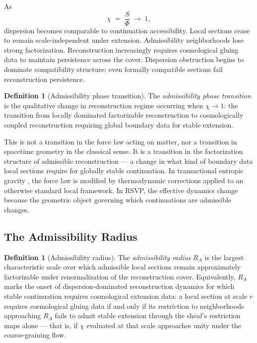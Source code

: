 \documentclass[11pt, a4paper]{article}
\theoremstyle{plain}
\theoremstyle{definition}
\newtheorem{definition}[theorem]{Definition}
\theoremstyle{remark}
\newcommand{\RA}{R_{\!A}}
\begin{document}
As
\begin{equation}
  \chi \;=\; \frac{S}{\Phi} \;\longrightarrow\; 1,
\end{equation}
dispersion becomes comparable to continuation accessibility. Local sections cease to
remain scale-independent under extension. Admissibility neighborhoods lose strong
factorization. Reconstruction increasingly requires cosmological gluing data to
maintain persistence across the cover. Dispersion obstruction begins to dominate
compatibility structure: even formally compatible sections fail reconstruction
persistence.

\begin{definition}[Admissibility phase transition]
\label{def:phase-trans}
The \emph{admissibility phase transition} is the qualitative change in reconstruction
regime occurring when $\chi \to 1$: the transition from locally dominated
factorizable reconstruction to cosmologically coupled reconstruction requiring global
boundary data for stable extension.
\end{definition}

This is not a transition in the force law acting on matter, nor a transition in
spacetime geometry in the classical sense. It is a transition in the factorization
structure of admissible reconstruction --- a change in what kind of boundary data
local sections require for globally stable continuation. In transactional entropic
gravity \cite{kastner2024}, the force law is modified by thermodynamic corrections
applied to an otherwise standard local framework. In RSVP, the effective dynamics
change because the geometric object governing which continuations are admissible
changes.

\subsection{The Admissibility Radius}

\begin{definition}[Admissibility radius]
\label{def:RA}
The \emph{admissibility radius} $\RA$ is the largest characteristic scale over which
admissible local sections remain approximately factorizable under renormalization of
the reconstruction cover. Equivalently, $\RA$ marks the onset of
dispersion-dominated reconstruction dynamics for which stable continuation requires
cosmological extension data: a local section at scale $r$ requires cosmological
gluing data if and only if its restriction to neighborhoods approaching $\RA$ fails
to admit stable extension through the sheaf's restriction maps alone --- that is, if
$\chi$ evaluated at that scale approaches unity under the coarse-graining flow.
\end{definition}
\end{document}
